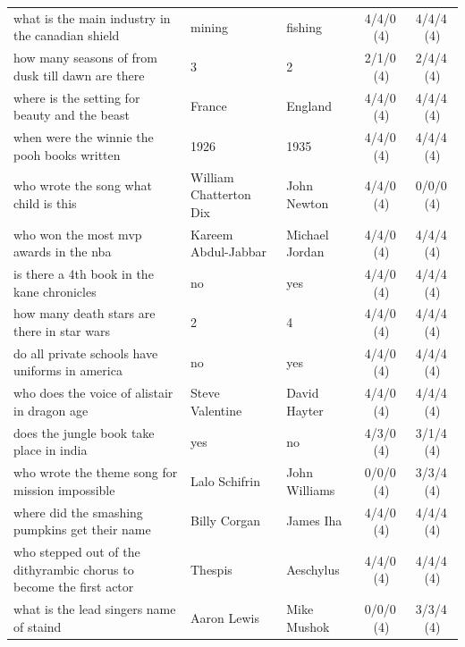 \begin{longtable}{@{}p{6.6cm}p{2.9cm}p{2.9cm}cc@{}}
\rowcolor{neutralgray}
what is the main industry in the canadian shield & mining & fishing & 4/4/0\,\footnotesize(4) & 4/4/4\,\footnotesize(4) \\
how many seasons of from dusk till dawn are there & 3 & 2 & 2/1/0\,\footnotesize(4) & 2/4/4\,\footnotesize(4) \\
\rowcolor{neutralgray}
where is the setting for beauty and the beast & France & England & 4/4/0\,\footnotesize(4) & 4/4/4\,\footnotesize(4) \\
when were the winnie the pooh books written & 1926 & 1935 & 4/4/0\,\footnotesize(4) & 4/4/4\,\footnotesize(4) \\
\rowcolor{neutralgray}
who wrote the song what child is this & William Chatterton Dix & John Newton & 4/4/0\,\footnotesize(4) & 0/0/0\,\footnotesize(4) \\
who won the most mvp awards in the nba & Kareem Abdul-Jabbar & Michael Jordan & 4/4/0\,\footnotesize(4) & 4/4/4\,\footnotesize(4) \\
\rowcolor{neutralgray}
is there a 4th book in the kane chronicles & no & yes & 4/4/0\,\footnotesize(4) & 4/4/4\,\footnotesize(4) \\
how many death stars are there in star wars & 2 & 4 & 4/4/0\,\footnotesize(4) & 4/4/4\,\footnotesize(4) \\
\rowcolor{neutralgray}
do all private schools have uniforms in america & no & yes & 4/4/0\,\footnotesize(4) & 4/4/4\,\footnotesize(4) \\
who does the voice of alistair in dragon age & Steve Valentine & David Hayter & 4/4/0\,\footnotesize(4) & 4/4/4\,\footnotesize(4) \\
\rowcolor{neutralgray}
does the jungle book take place in india & yes & no & 4/3/0\,\footnotesize(4) & 3/1/4\,\footnotesize(4) \\
who wrote the theme song for mission impossible & Lalo Schifrin & John Williams & 0/0/0\,\footnotesize(4) & 3/3/4\,\footnotesize(4) \\
\rowcolor{neutralgray}
where did the smashing pumpkins get their name & Billy Corgan & James Iha & 4/4/0\,\footnotesize(4) & 4/4/4\,\footnotesize(4) \\
who stepped out of the dithyrambic chorus to become the first actor & Thespis & Aeschylus & 4/4/0\,\footnotesize(4) & 4/4/4\,\footnotesize(4) \\
\rowcolor{neutralgray}
what is the lead singers name of staind & Aaron Lewis & Mike Mushok & 0/0/0\,\footnotesize(4) & 3/3/4\,\footnotesize(4) \\

\end{longtable}
